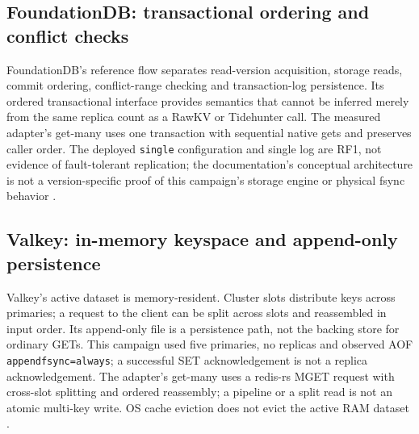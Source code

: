 \documentclass[11pt,a4paper]{article}
\begin{document}
\subsection{FoundationDB: transactional ordering and conflict checks}
FoundationDB's reference flow separates read-version acquisition, storage reads, commit ordering, conflict-range checking and transaction-log persistence. Its ordered transactional interface provides semantics that cannot be inferred merely from the same replica count as a RawKV or Tidehunter call. The measured adapter's get-many uses one transaction with sequential native gets and preserves caller order. The deployed \texttt{single} configuration and single log are RF1, not evidence of fault-tolerant replication; the documentation's conceptual architecture is not a version-specific proof of this campaign's storage engine or physical fsync behavior \cite{fdbarchitecture,fdbconfig7377}.

\subsection{Valkey: in-memory keyspace and append-only persistence}
Valkey's active dataset is memory-resident. Cluster slots distribute keys across primaries; a request to the client can be split across slots and reassembled in input order. Its append-only file is a persistence path, not the backing store for ordinary GETs. This campaign used five primaries, no replicas and observed AOF \texttt{appendfsync=always}; a successful SET acknowledgement is not a replica acknowledgement. The adapter's get-many uses a redis-rs MGET request with cross-slot splitting and ordered reassembly; a pipeline or a split read is not an atomic multi-key write. OS cache eviction does not evict the active RAM dataset \cite{valkeycluster,valkeypersistence,valkeypipeline}.
\end{document}
